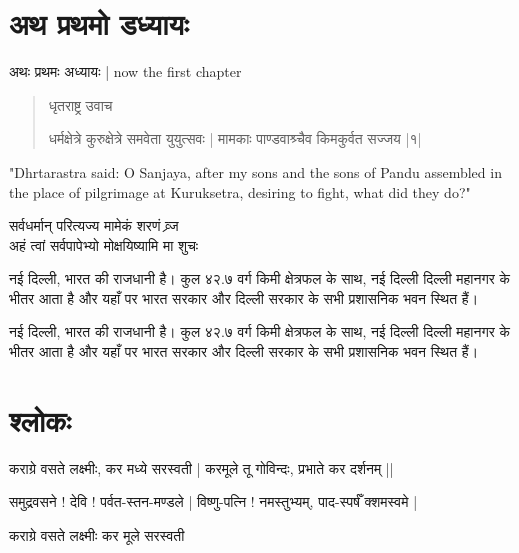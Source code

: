 \chapter{अथ प्रथमो डध्यायः}

\begin{center}
	अथः प्रथमः अध्यायः | now the first chapter
\end{center}

\begin{verse}
धृतराष्ट्र उवाच

धर्मक्षेत्रे कुरुक्षेत्रे समवेता युयुत्सवः |
मामकाः पाण्डवाश्र्चैव किमकुर्वत सज्जय |१|
\end{verse}
"Dhrtarastra said: O Sanjaya, after my sons and the sons of Pandu assembled in the place of pilgrimage at Kuruksetra, desiring to fight, what did they do?"

\begin{center}

सर्वधर्मान् परित्यज्य मामेकं शरणं व्र्ज\\
अहं त्वां सर्वपापेभ्यो मोक्षयिष्यामि मा शुचः

\end{center}

नई दिल्ली, भारत की राजधानी है। कुल ४२.७ वर्ग किमी क्षेत्रफल के साथ, नई दिल्ली दिल्ली महानगर
के भीतर आता है और यहाँ पर भारत सरकार और दिल्ली सरकार के सभी प्रशासनिक भवन स्थित हैं।

नई दिल्ली, भारत की राजधानी है। कुल ४२.७ वर्ग किमी क्षेत्रफल के साथ, नई दिल्ली दिल्ली महानगर
के भीतर आता है और यहाँ पर भारत सरकार और दिल्ली सरकार के सभी प्रशासनिक भवन स्थित हैं।

\chapter{श्लोकः}

कराग्रे वसते लक्ष्मीः, कर मध्ये सरस्वती |
करमूले तू गोविन्दः, प्रभाते कर दर्शनम्  ||

समुद्रवसने ! देवि ! पर्वत-स्तन-मण्डले |
विष्णु-पत्नि ! नमस्तुभ्यम्, पाद-स्पर्षँ क्शमस्वमे |


कराग्रे वसते लक्ष्मीः कर मूले सरस्वती